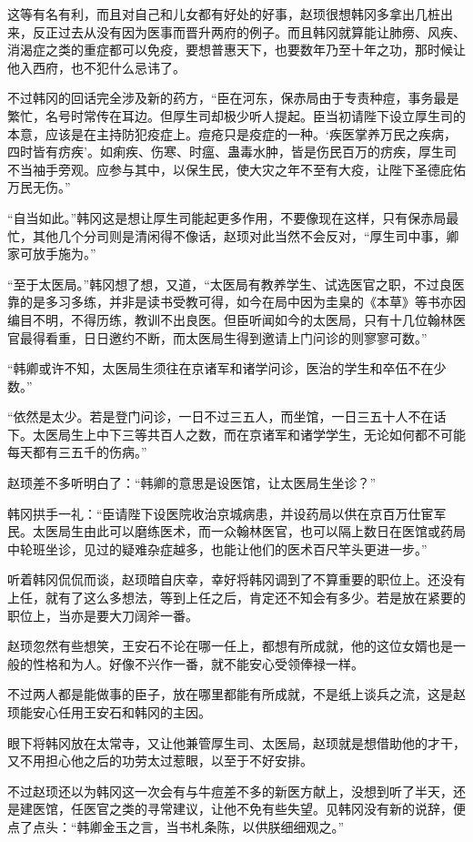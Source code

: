 这等有名有利，而且对自己和儿女都有好处的好事，赵顼很想韩冈多拿出几桩出来，反正过去从没有因为医事而晋升两府的例子。而且韩冈就算能让肺痨、风疾、消渴症之类的重症都可以免疫，要想普惠天下，也要数年乃至十年之功，那时候让他入西府，也不犯什么忌讳了。

不过韩冈的回话完全涉及新的药方，“臣在河东，保赤局由于专责种痘，事务最是繁忙，名号时常传在耳边。但厚生司却极少听人提起。臣当初请陛下设立厚生司的本意，应该是在主持防犯疫症上。痘疮只是疫症的一种。‘疾医掌养万民之疾病，四时皆有疠疾’。如痢疾、伤寒、时瘟、蛊毒水肿，皆是伤民百万的疠疾，厚生司不当袖手旁观。应参与其中，以保生民，使大灾之年不至有大疫，让陛下圣德庇佑万民无伤。”

“自当如此。”韩冈这是想让厚生司能起更多作用，不要像现在这样，只有保赤局最忙，其他几个分司则是清闲得不像话，赵顼对此当然不会反对，“厚生司中事，卿家可放手施为。”

“至于太医局。”韩冈想了想，又道，“太医局有教养学生、试选医官之职，不过良医靠的是多习多练，并非是读书受教可得，如今在局中因为圭臬的《本草》等书亦因编目不明，不得历练，教训不出良医。但臣听闻如今的太医局，只有十几位翰林医官最得看重，日日邀约不断，而太医局生得到邀请上门问诊的则寥寥可数。”

“韩卿或许不知，太医局生须往在京诸军和诸学问诊，医治的学生和卒伍不在少数。”

“依然是太少。若是登门问诊，一日不过三五人，而坐馆，一日三五十人不在话下。太医局生上中下三等共百人之数，而在京诸军和诸学学生，无论如何都不可能每天都有三五千的伤病。”

赵顼差不多听明白了：“韩卿的意思是设医馆，让太医局生坐诊？”

韩冈拱手一礼：“臣请陛下设医院收治京城病患，并设药局以供在京百万仕宦军民。太医局生由此可以磨练医术，而一众翰林医官，也可以隔上数日在医馆或药局中轮班坐诊，见过的疑难杂症越多，也能让他们的医术百尺竿头更进一步。”

听着韩冈侃侃而谈，赵顼暗自庆幸，幸好将韩冈调到了不算重要的职位上。还没有上任，就有了这么多想法，等到上任之后，肯定还不知会有多少。若是放在紧要的职位上，当亦是要大刀阔斧一番。

赵顼忽然有些想笑，王安石不论在哪一任上，都想有所成就，他的这位女婿也是一般的性格和为人。好像不兴作一番，就不能安心受领俸禄一样。

不过两人都是能做事的臣子，放在哪里都能有所成就，不是纸上谈兵之流，这是赵顼能安心任用王安石和韩冈的主因。

眼下将韩冈放在太常寺，又让他兼管厚生司、太医局，赵顼就是想借助他的才干，又不用担心他之后的功劳太过惹眼，以至于不好安排。

不过赵顼还以为韩冈这一次会有与牛痘差不多的新医方献上，没想到听了半天，还是建医馆，任医官之类的寻常建议，让他不免有些失望。见韩冈没有新的说辞，便点了点头：“韩卿金玉之言，当书札条陈，以供朕细细观之。”

